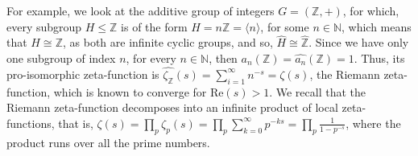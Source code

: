 \documentclass[12pt]{article}
\begin{document}
For example, we look at the additive group of integers $G=(\mathbb{Z},+)$, for which, every subgroup $H\leq{\mathbb{Z}}$ is of the form $H=n\mathbb{Z}=\langle n\rangle$, for some $n\in\mathbb{N}$, which means that $H\cong \mathbb{Z}$, as both are infinite cyclic groups, and so, $\widehat{H}\cong\widehat{\mathbb{Z}}$. Since we have only one subgroup of index $n$, for every $n\in\mathbb{N}$, then $a_n(\mathbb{Z})=\hat{a_n}(\mathbb{Z})=1$. Thus, its pro-isomorphic zeta-function is $\hat{\zeta_{\mathbb{Z}}}(s)=\sum_{i=1}^{\infty}n^{-s}=\zeta(s)$, the Riemann zeta-function, which is known to converge for $\mathrm{Re}(s)>1$. We recall that the Riemann zeta-function decomposes into an infinite product of local zeta-functions, that is, $\zeta(s)=\prod_p\zeta_p(s)=\prod_p\sum_{k=0}^\infty p^{-ks}=\prod_p\frac{1}{1-p^{-s}}$, where the product runs over all the prime numbers.
\end{document}
